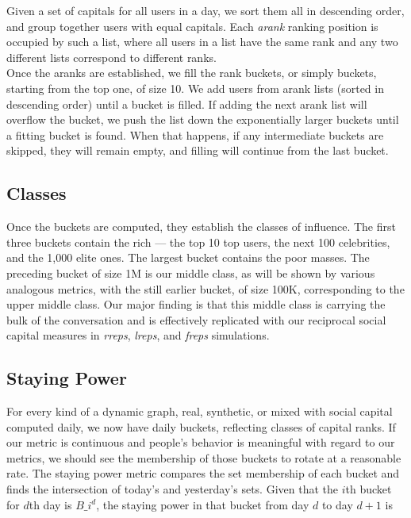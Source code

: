 \documentclass[10pt,oneside]{memoir}
\begin{document}
Given a set of capitals for all users in a day, we sort them all in descending order, and group together users with equal capitals.  Each \emph{arank} ranking position is occupied by such a list, where all users in a list have the same rank and any two different lists correspond to different ranks. \\
Once the aranks are established, we fill the rank buckets, or simply buckets, starting from the top one, of size 10.  We add users from arank lists (sorted in descending order) until a bucket is filled.  If adding the next arank list will overflow the bucket, we push the list down the exponentially larger buckets until a fitting bucket is found.  When that happens, if any intermediate buckets are skipped, they will remain empty, and filling will continue from the last bucket.


\subsection{Classes}
\label{classes}

Once the buckets are computed, they establish the classes of influence.  The first three buckets contain the rich --- the top 10 top users, the next 100 celebrities, and the 1,000 elite ones.  The largest bucket contains the poor masses.  The preceding bucket of size 1M is our middle class, as will be shown by various analogous metrics, with the still earlier bucket, of size 100K, corresponding to the upper middle class. Our major finding is that this middle class is carrying the bulk of the conversation and is effectively replicated with our reciprocal social capital measures in \emph{rreps}, \emph{lreps}, and \emph{freps} simulations.


\subsection{Staying Power}
\label{stayingpower}

For every kind of a dynamic graph, real, synthetic, or mixed with social capital computed daily, we now have daily buckets, reflecting classes of capital ranks.  If our metric is continuous and people's behavior is meaningful with regard to our metrics, we should see the membership of those buckets to rotate at a reasonable rate.  The staying power metric compares the set membership of each bucket and finds the intersection of today's and yesterday's sets.  Given that the $i$th bucket for $d$th day is $B\_i^d$, the staying power in that bucket from day $d$ to day $d+1$ is
\end{document}

